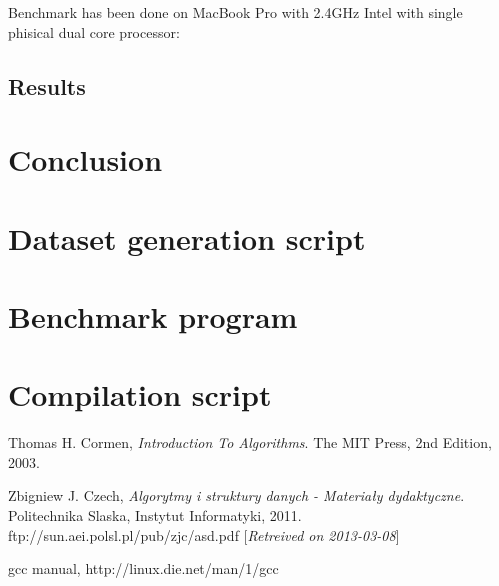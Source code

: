 \documentclass[12pt]{article}
\begin{document}
Benchmark has been done on MacBook Pro with 2.4GHz Intel with single phisical dual core processor:



\subsection{Results}

\section{Conclusion}

\begin{appendices}
	\section{Dataset generation script}
	\label{app:dataset}

	
	
	\section{Benchmark program}
	\label{app:benchmark}

	
	
	\section{Compilation script}
	\label{app:compilation}

	

\end{appendices}

\begin{thebibliography}{9}

  Thomas H. Cormen,
  \emph{Introduction To Algorithms}.
  The MIT Press,
  2nd Edition,
  2003.

  Zbigniew J. Czech,
  \emph{Algorytmy i struktury danych - Materiały dydaktyczne}.
  Politechnika Slaska, Instytut Informatyki,
  2011.
  ftp://sun.aei.polsl.pl/pub/zjc/asd.pdf [\emph{Retreived on 2013-03-08}]

  gcc manual,
  http://linux.die.net/man/1/gcc

\end{thebibliography}
 
\end{document}
